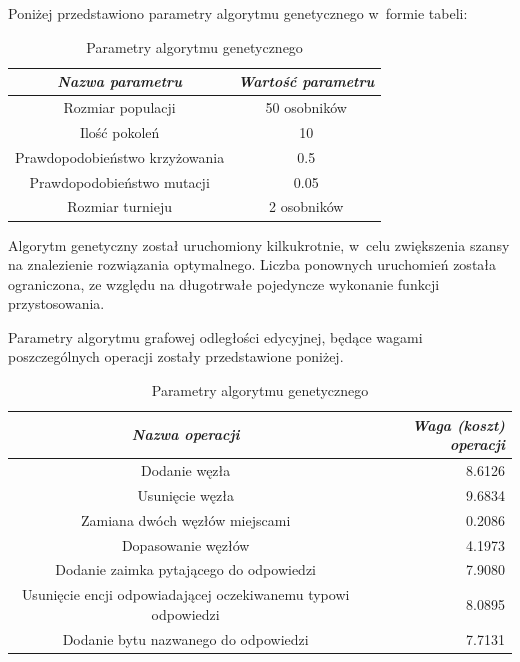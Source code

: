 \documentclass[a4paper, twoside, 12pt]{report}
\begin{document}
        Poniżej przedstawiono parametry algorytmu genetycznego w~formie tabeli:
            \begin{table}[h]
                \centering
                \begin{tabular}{ | c | c | }
                  \hline
                  \emph{Nazwa parametru} & \emph{Wartość parametru} \\ \hline
                  Rozmiar populacji & 50 osobników \\ \hline
                  Ilość pokoleń & 10 \\ \hline
                  Prawdopodobieństwo krzyżowania & 0.5 \\ \hline
                  Prawdopodobieństwo mutacji & 0.05 \\ \hline
                  Rozmiar turnieju & 2 osobników \\ \hline
                \end{tabular}
                \caption{Parametry algorytmu genetycznego}
                \label{TAB:GEN_PARAMS}
            \end{table}

        Algorytm genetyczny został uruchomiony kilkukrotnie, w~celu zwiększenia szansy na znalezienie rozwiązania
        optymalnego. Liczba ponownych uruchomień została ograniczona, ze względu na długotrwałe pojedyncze wykonanie
        funkcji przystosowania.

        Parametry algorytmu grafowej odległości edycyjnej, będące wagami poszczególnych operacji zostały przedstawione
        poniżej.

            \begin{table}[h]
                \centering
                \begin{tabular}{ | c | r | }
                  \hline
                  \emph{Nazwa operacji} & \emph{Waga (koszt) operacji} \\ \hline
                  Dodanie węzła & 8.6126\\ \hline
                  Usunięcie węzła & 9.6834 \\ \hline
                  Zamiana dwóch węzłów miejscami & 0.2086 \\ \hline
                  Dopasowanie węzłów & 4.1973 \\ \hline
                  Dodanie zaimka pytającego do odpowiedzi & 7.9080 \\ \hline
                  Usunięcie encji odpowiadającej oczekiwanemu typowi odpowiedzi & 8.0895 \\ \hline
                  Dodanie bytu nazwanego do odpowiedzi & 7.7131 \\ \hline
                \end{tabular}
                \caption{Parametry algorytmu genetycznego}
                \label{TAB:WEIGHTS}
            \end{table}
\end{document}
